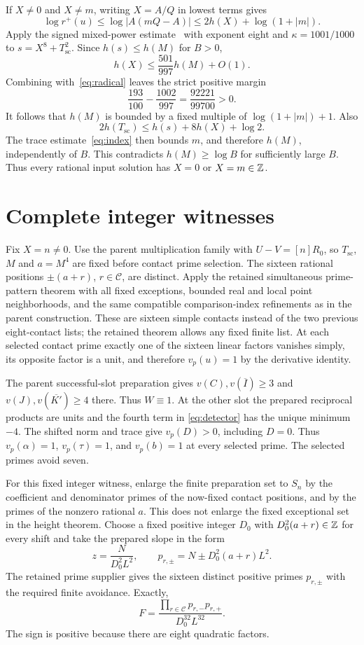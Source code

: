 \documentclass[11pt,a4paper]{article}
\begin{document}
If $X\ne0$ and $X\ne m$, writing $X=A/Q$ in lowest terms gives
\[
 \log r^+(u)\le\log|A(mQ-A)|
             \le2h(X)+\log(1+|m|).
\]
Apply the signed mixed-power estimate~\cite{v58} with exponent eight
and $\kappa=1001/1000$ to $s=X^8+T_{\mathrm{sc}}^2$. Since
$h(s)\le h(M)$ for $B>0$,
\[
 h(X)\le\frac{501}{997}h(M)+O(1).
\]
Combining with~\eqref{eq:radical} leaves the strict positive margin
\[
 \frac{193}{100}-\frac{1002}{997}
                       =\frac{92221}{99700}>0.
\]
It follows that $h(M)$ is bounded by a fixed multiple of
$\log(1+|m|)+1$. Also
\[
 2h(T_{\mathrm{sc}})\le h(s)+8h(X)+\log2.
\]
The trace estimate~\eqref{eq:index} then bounds $m$, and therefore
$h(M)$, independently of $B$. This contradicts $h(M)\ge\log B$
for sufficiently large $B$. Thus every rational input solution has
$X=0$ or $X=m\in\mathbb Z$.

\section{Complete integer witnesses}

Fix $X=n\ne0$. Use the parent multiplication family with
$U-V=[n]R_0$, so $T_{\mathrm{sc}}$, $M$ and $a=M^4$ are fixed before
contact prime selection. The sixteen rational positions $\pm(a+r)$,
$r\in\mathcal C$, are distinct. Apply the retained simultaneous
prime-pattern theorem with all fixed exceptions, bounded real and local
point neighborhoods, and the same compatible comparison-index refinements
as in the parent construction. These are sixteen simple contacts instead
of the two previous eight-contact lists; the retained theorem allows any
fixed finite list. At each selected contact prime exactly one of the
sixteen linear factors vanishes simply, its opposite factor is a unit,
and therefore $v_p(u)=1$ by the derivative identity.

The parent successful-slot preparation gives $v(C),v(\overline I)\ge3$
and $v(J),v(\overline{K'})\ge4$ there. Thus $W\equiv1$. At the other
slot the prepared reciprocal products are units and the fourth term in
\eqref{eq:detector} has the unique minimum $-4$. The shifted norm and
trace give $v_p(D)>0$, including $D=0$. Thus $v_p(\alpha)=1$,
$v_p(\tau)=1$, and $v_p(b)=1$ at every selected prime. The selected
primes avoid seven.

For this fixed integer witness, enlarge the finite preparation set to
$S_n$ by the coefficient and denominator primes of the now-fixed contact
positions, and by the primes of the nonzero rational $a$. This does not
enlarge the fixed exceptional set in the height theorem. Choose a fixed
positive integer $D_0$ with $D_0^2(a+r)\in\mathbb Z$ for every shift and take
the prepared slope in the form
\[
 z=\frac{N}{D_0^2L^2},\qquad
 p_{r,\pm}=N\pm D_0^2(a+r)L^2.
\]
The retained prime supplier gives the sixteen distinct positive primes
$p_{r,\pm}$ with the required finite avoidance. Exactly,
\begin{equation}\label{eq:prime-factorization}
 F=\frac{\prod_{r\in\mathcal C}p_{r,-}p_{r,+}}
                {D_0^{32}L^{32}}.
\end{equation}
The sign is positive because there are eight quadratic factors.
\end{document}
